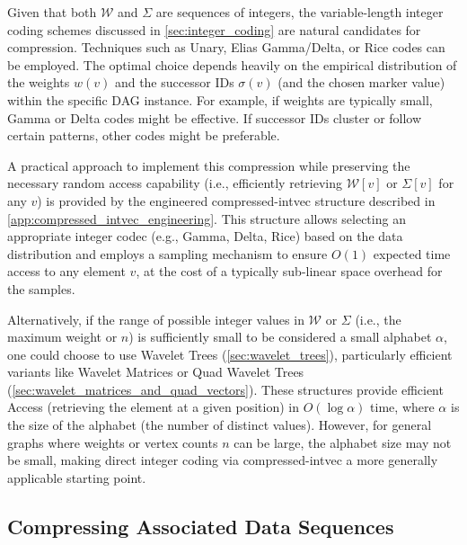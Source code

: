 Given that both $\mathcal{W}$ and $\Sigma$ are sequences of integers, the variable-length integer coding schemes discussed in \autoref{sec:integer_coding} are natural candidates for compression. Techniques such as Unary, Elias Gamma/Delta, or Rice codes can be employed. The optimal choice depends heavily on the empirical distribution of the weights $w(v)$ and the successor IDs $\sigma(v)$ (and the chosen marker value) within the specific DAG instance. For example, if weights are typically small, Gamma or Delta codes might be effective. If successor IDs cluster or follow certain patterns, other codes might be preferable.

A practical approach to implement this compression while preserving the necessary random access capability (i.e., efficiently retrieving $\mathcal{W}[v]$ or $\Sigma[v]$ for any $v$) is provided by the engineered \textsf{compressed-intvec} structure described in \autoref{app:compressed_intvec_engineering}. This structure allows selecting an appropriate integer codec (e.g., Gamma, Delta, Rice) based on the data distribution and employs a sampling mechanism to ensure $O(1)$ expected time access to any element $v$, at the cost of a typically sub-linear space overhead for the samples.

Alternatively, if the range of possible integer values in $\mathcal{W}$ or $\Sigma$ (i.e., the maximum weight or $n$) is sufficiently small to be considered a small alphabet $\alpha$, one could choose to use Wavelet Trees (\autoref{sec:wavelet_trees}), particularly efficient variants like Wavelet Matrices or Quad Wavelet Trees (\autoref{sec:wavelet_matrices_and_quad_vectors}). These structures provide efficient Access (retrieving the element at a given position) in $O(\log \alpha)$ time, where $\alpha$ is the size of the alphabet (the number of distinct values). However, for general graphs where weights or vertex counts $n$ can be large, the alphabet size may not be small, making direct integer coding via \textsf{compressed-intvec} a more generally applicable starting point.

\subsection{Compressing Associated Data Sequences}
\label{subsec:compressing_associated_data_sequences}

